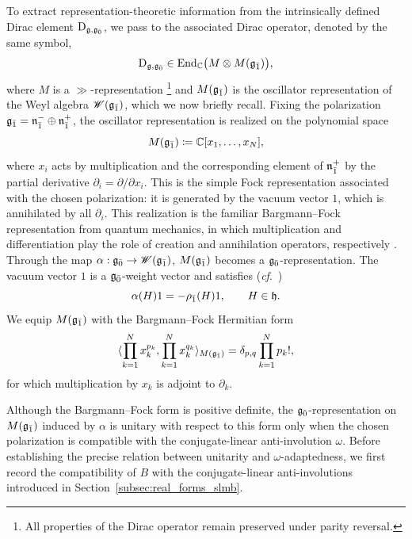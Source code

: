 To extract representation-theoretic information from the intrinsically defined Dirac element $\operatorname{D}_{{\mathfrak{g}},{\mathfrak{g}_{\bar{0}}}}$, we pass to the associated Dirac operator, denoted by the same symbol,
\begin{equation}
\operatorname{D}_{{\mathfrak{g}},{\mathfrak{g}_{\bar{0}}}}\in\operatorname{End}_{{\mathbb C}}\bigl(M\otimes M({\mathfrak{g}_{\bar{1}}})\bigr),
\end{equation}
where $M$ is a $\gg$-representation \footnote{All properties of the Dirac operator remain preserved under parity reversal.} and $M({\mathfrak{g}_{\bar{1}}})$ is the oscillator representation of the Weyl algebra $\mathscr{W}({\mathfrak{g}_{\bar{1}}})$, which we now briefly recall. Fixing the polarization ${\mathfrak{g}_{\bar{1}}}={\mathfrak{n}}_{\bar1}^{-}\oplus{\mathfrak{n}}_{\bar1}^{+}$, the oscillator representation is realized on the polynomial space
\begin{equation}
M({\mathfrak{g}_{\bar{1}}})\coloneqq{\mathbb C}[x_1,\ldots,x_{N}],
\end{equation}
where $x_i$ acts by multiplication and the corresponding element of ${\mathfrak{n}}_{\bar1}^{+}$ by the partial derivative $\partial_i=\partial/\partial x_i$. This is the simple Fock representation associated with the chosen polarization: it is generated by the vacuum vector $1$, which is annihilated by all $\partial_i$. This realization is the familiar Bargmann–Fock representation from quantum mechanics, in which multiplication and differentiation play the role of creation and annihilation operators, respectively \cite{BargmannHermitianForm}. Through the map $\alpha:{\mathfrak{g}_{\bar{0}}}\to\mathscr{W}({\mathfrak{g}_{\bar{1}}})$, $M({\mathfrak{g}_{\bar{1}}})$ becomes a ${\mathfrak{g}_{\bar{0}}}$-representation. The vacuum vector $1$ is a ${\mathfrak{g}_{\bar{0}}}$-weight vector and satisfies (\emph{cf}.~\cite{SchmidtDirac})
\begin{equation}
\alpha(H)1=-\rho_{\bar1}(H)1,\qquad H\in{\mathfrak h}.
\end{equation}
We equip $M({\mathfrak{g}_{\bar{1}}})$ with the Bargmann–Fock Hermitian form
\begin{equation}\label{eq::Bargmann_Fock_form}
\langle\prod_{k=1}^{N}x_k^{p_k},\prod_{k=1}^{N}x_k^{q_k}\rangle_{M({\mathfrak{g}_{\bar{1}}})}
=
\delta_{p,q}\prod_{k=1}^{N}p_k!,
\end{equation}
for which multiplication by $x_k$ is adjoint to $\partial_k$. 

Although the Bargmann--Fock form is positive definite, the ${\mathfrak{g}_{\bar{0}}}$-representation on $M({\mathfrak{g}_{\bar{1}}})$ induced by $\alpha$ is unitary with respect to this form only when the chosen polarization is compatible with the conjugate-linear anti-involution $\omega$. Before establishing the precise relation between unitarity and $\omega$-adaptedness, we first record the compatibility of $B$ with the conjugate-linear anti-involutions introduced in Section~\ref{subsec:real_forms_slmb}.

